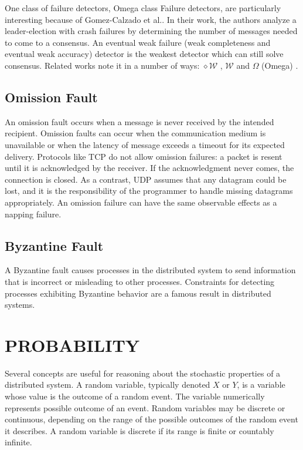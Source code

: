 One class of failure detectors, Omega class Failure detectors, are particularly interesting because of Gomez-Calzado et al.\cite{LEADERELECTIONEVAL}.
In their work, the authors analyze a leader-election with crash failures by determining the number of messages needed to come to a consensus.
An eventual weak failure (weak completeness and eventual weak accuracy) detector is the weakest detector which can still solve consensus. Related works note it in a number of ways: $\diamond \mathcal{W}$ \cite{FAILUREDETECTORS}, $\mathcal{W}$ \cite{WEAKESTFAILURE1} \cite{WEAKESTFAILURE2} and $\Omega$ (Omega) \cite{LEADERELECTIONEVAL}.

\subsection{Omission Fault}

An omission fault\cite{OMISSIONFAILURES} occurs when a message is never received by the intended recipient.
Omission faults can occur when the communication medium is unavailable or when the latency of message exceeds a timeout for its expected delivery.
Protocols like TCP do not allow omission failures: a packet is resent until it is acknowledged by the receiver.
If the acknowledgment never comes, the connection is closed.
As a contrast, UDP assumes that any datagram could be lost, and it is the responsibility of the programmer to handle missing datagrams appropriately.
An omission failure can have the same observable effects as a napping failure\cite{DISTRIBUTED}.

\subsection{Byzantine Fault}

A Byzantine fault causes processes in the distributed system to send information that is incorrect or misleading to other processes.
Constraints for detecting processes exhibiting Byzantine behavior are a famous result in distributed systems\cite{byzantine-generals}.

\section{PROBABILITY}

Several concepts are useful for reasoning about the stochastic properties of a distributed system.
A random variable, typically denoted $X$ or $Y$, is a variable whose value is the outcome of a random event.
The variable numerically represents possible outcome of an event.
Random variables may be discrete or continuous, depending on the range of the possible outcomes of the random event it describes.
A random variable is discrete if its range is finite or countably infinite.

